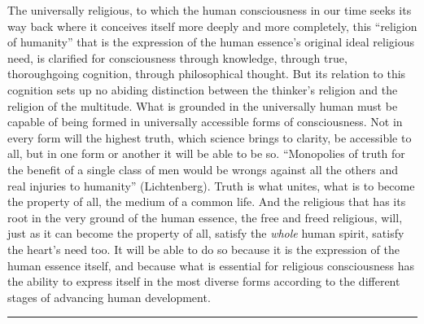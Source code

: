 \documentclass[12pt,a4paper,openany]{book}
\newcommand{\opage}[1]{\marginnote{\footnotesize\textit{[#1]}}}
\begin{document}
The universally religious, to which the human consciousness
in our time seeks its way back where it conceives itself
more deeply and more completely, this ``religion of humanity''
that is the expression of the human essence's original ideal
religious need, is clarified for consciousness through knowledge,
through true, thoroughgoing cognition, through
philosophical thought. But its relation to this cognition
sets up no abiding distinction between the thinker's
religion and the religion of the multitude. What is grounded in
the universally human must be capable of being formed in universally
accessible forms of consciousness. Not in every form will the
highest truth, which science brings to clarity, be accessible
to all, but in one form or another it will be able to be
so. ``Monopolies of truth for the benefit of a single class of men
would be wrongs against all the others and real
injuries to humanity'' (Lichtenberg). Truth
\opage{298}is what unites, what is to become the property of all, the medium of a common
life. And the religious that has its root in
the very ground of the human essence, the free and freed religious,
will, just as it can become the property of all, satisfy
the \emph{whole} human spirit, satisfy the heart's
need too. It will be able to do so because it is the expression of the human essence
itself, and because what is essential for religious consciousness
has the ability to express itself in the most diverse
forms according to the different stages of advancing human
development.

\begin{center}\rule{1.8cm}{0.4pt}\end{center}
\end{document}
